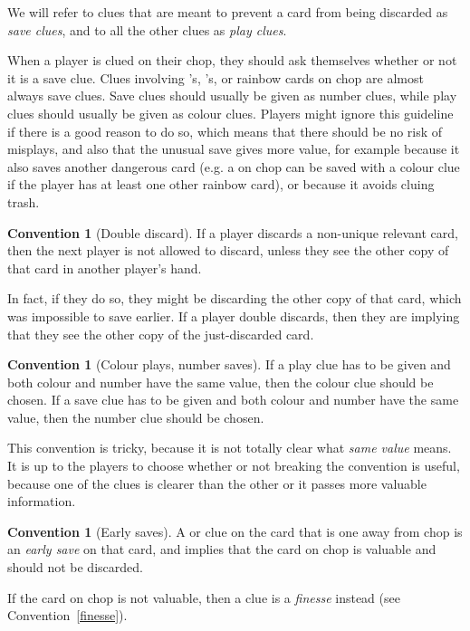 \documentclass[a4paper]{article}
\theoremstyle{plain}
\theoremstyle{definition}
\newtheorem{convention}[theorem]{Convention}
\begin{document}
We will refer to clues that are meant to prevent a card from being discarded as \textit{save clues}, and to all the other clues as \textit{play clues}.

When a player is clued on their chop, they should ask themselves whether or not it is a save clue. Clues involving 's, 's, or rainbow cards on chop are almost always save clues. Save clues should usually be given as number clues, while play clues should usually be given as colour clues. Players might ignore this guideline if there is a good reason to do so, which means that there should be no risk of misplays, and also that the unusual save gives more value, for example because it also saves another dangerous card (e.g. a  on chop can be saved with a colour clue if the player has at least one other rainbow card), or because it avoids cluing trash.

\begin{convention}[Double discard]
	If a player discards a non-unique relevant card, then the next player is not allowed to discard, unless they see the other copy of that card in another player's hand.
\end{convention}

In fact, if they do so, they might be discarding the other copy of that card, which was impossible to save earlier. If a player double discards, then they are implying that they see the other copy of the just-discarded card.

\begin{convention}[Colour plays, number saves]
	If a play clue has to be given and both colour and number have the same value, then the colour clue should be chosen. If a save clue has to be given and both colour and number have the same value, then the number clue should be chosen.
\end{convention}

This convention is tricky, because it is not totally clear what \textit{same value} means. It is up to the players to choose whether or not breaking the convention is useful, because one of the clues is clearer than the other or it passes more valuable information.

\begin{convention}[Early saves]
	A  or  clue on the card that is one away from chop is an \textit{early save} on that card, and implies that the card on chop is valuable and should not be discarded.
	
	If the card on chop is not valuable, then a  clue is a \textit{finesse} instead (see Convention~\ref{finesse}).
\end{convention}
\end{document}
